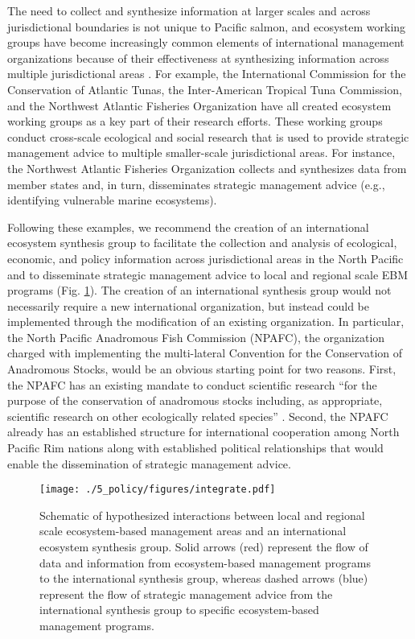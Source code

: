 The need to collect and synthesize information at larger scales and across
jurisdictional boundaries is not unique to Pacific salmon, and ecosystem working
groups have become increasingly common elements of international management
organizations because of their effectiveness at synthesizing information across
multiple jurisdictional areas \citep{Engler2015, Lascelles2014}. For example,
the International Commission for the Conservation of Atlantic Tunas, the
Inter-American Tropical Tuna Commission, and the Northwest Atlantic Fisheries
Organization have all created ecosystem working groups as a key part of their
research efforts. These working groups conduct cross-scale ecological and social
research that is used to provide strategic management advice to multiple
smaller-scale jurisdictional areas. For instance, the Northwest Atlantic
Fisheries Organization collects and synthesizes data from member states and, in
turn, disseminates strategic management advice (e.g., identifying vulnerable
marine ecosystems).

Following these examples, we recommend the creation of an international
ecosystem synthesis group to facilitate the collection and analysis of
ecological, economic, and policy information across jurisdictional areas in the
North Pacific and to disseminate strategic management advice to local and
regional scale EBM programs (Fig. \ref{fig:ebm:4}). The creation of an
international synthesis group would not necessarily require a new international
organization, but instead could be implemented through the modification of an
existing organization. In particular, the North Pacific Anadromous Fish
Commission (NPAFC), the organization charged with implementing the multi-lateral
Convention for the Conservation of Anadromous Stocks, would be an obvious
starting point for two reasons. First, the NPAFC has an existing mandate to
conduct scientific research ``for the purpose of the conservation of anadromous
stocks including, as appropriate, scientific research on other ecologically
related species'' \citep{CCAS1992}. Second, the NPAFC already has an established
structure for international cooperation among North Pacific Rim nations along
with established political relationships that would enable the dissemination of
strategic management advice.

\begin{figure}[htbp]
  \centering \texttt{[image: ./5\_policy/figures/integrate.pdf]}
  \caption[Schematic of hypothesized interactions between multiple
           ecosystem-based management areas and an international ecosystem
           synthesis group]{Schematic of hypothesized interactions between
           local and regional scale ecosystem-based management areas and an
           international ecosystem synthesis group. Solid arrows (red) represent
           the flow of data and information from ecosystem-based management
           programs to the international synthesis group, whereas dashed arrows
           (blue) represent the flow of strategic management advice from the
           international synthesis group to specific ecosystem-based management
           programs.}
  \label{fig:ebm:4}
\end{figure}

